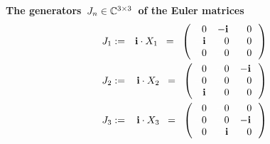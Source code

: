 \noindent
\textbf{The generators \,$J_{n} \in \mathbb{C}^{3 \times 3}$\, of the Euler matrices}
\begin{eqnarray*}
J_{1}
& := &
	\i \cdot X_{1}
\;\; = \;\;
	\left(\!
		\begin{array}{ccc}
			{\color{white}-}0 & {\color{black}-}\i & {\color{white}-}0 \\
			{\color{white}-}\i & {\color{white}-}0 & {\color{white}-}0 \\
			{\color{white}-}0 & {\color{white}-}0 & {\color{white}-}0 \\
			\end{array}
		\,\right)
\\
J_{2}
& := &
	\i \cdot X_{2}
\;\; = \;\;
	\left(\!\!
		\begin{array}{ccc}
			{\color{white}-}0 & {\color{white}-}0 & {\color{black}-}\i \\
			{\color{white}-}0 & {\color{white}-}0 & {\color{white}-}0 \\
			{\color{white}-}\i & {\color{white}-}0 & {\color{white}-}0 \\
			\end{array}
		\,\right)
\\
J_{3}
& := &
	\i \cdot X_{3}
\;\; = \;\;
	\left(\!\!
		\begin{array}{ccc}
			{\color{white}-}0 & {\color{white}-}0 & {\color{white}-}0 \\
			{\color{white}-}0 & {\color{white}-}0 & {\color{black}-}\i \\
			{\color{white}-}0 & {\color{white}-}\i & {\color{white}-}0 \\
			\end{array}
		\,\right)
\end{eqnarray*}

